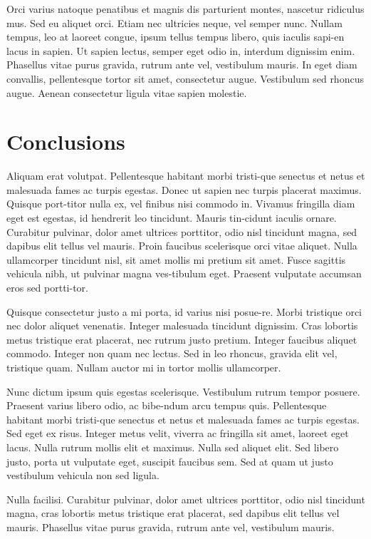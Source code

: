 ﻿\documentclass[10pt,a4paper,twocolumn,twoside]{article}
\begin{document}
Orci varius natoque penatibus et magnis dis parturient montes, nascetur ridiculus mus. Sed eu aliquet orci. Etiam nec ultricies neque, vel semper nunc. Nullam tempus, leo at laoreet congue, ipsum tellus tempus libero, quis iaculis sapi-en lacus in sapien. Ut sapien lectus, semper eget odio in, interdum dignissim enim. Phasellus vitae purus gravida, rutrum ante vel, vestibulum mauris. In eget diam convallis, pellentesque tortor sit amet, consectetur augue. Vestibulum sed rhoncus augue. Aenean consectetur ligula vitae sapien molestie. 


\section{Conclusions}

Aliquam erat volutpat. Pellentesque habitant morbi tristi-que senectus et netus et malesuada fames ac turpis egestas. Donec ut sapien nec turpis placerat maximus. Quisque port-titor nulla ex, vel finibus nisi commodo in. Vivamus fringilla diam eget est egestas, id hendrerit leo tincidunt. Mauris tin-cidunt iaculis ornare. Curabitur pulvinar, dolor amet ultrices porttitor, odio nisl tincidunt magna, sed dapibus elit tellus vel mauris. Proin faucibus scelerisque orci vitae aliquet. Nulla ullamcorper tincidunt nisl, sit amet mollis mi pretium sit amet. Fusce sagittis vehicula nibh, ut pulvinar magna ves-tibulum eget. Praesent vulputate accumsan eros sed portti-tor. 

Quisque consectetur justo a mi porta, id varius nisi posue-re. Morbi tristique orci nec dolor aliquet venenatis. Integer malesuada tincidunt dignissim. Cras lobortis metus tristique erat placerat, nec rutrum justo pretium. Integer faucibus aliquet commodo. Integer non quam nec lectus. Sed in leo rhoncus, gravida elit vel, tristique quam. Nullam auctor mi in tortor mollis ullamcorper. 

Nunc dictum ipsum quis egestas scelerisque. Vestibulum rutrum tempor posuere. Praesent varius libero odio, ac bibe-ndum arcu tempus quis. Pellentesque habitant morbi tristi-que senectus et netus et malesuada fames ac turpis egestas. Sed eget ex risus. Integer metus velit, viverra ac fringilla sit amet, laoreet eget lacus. Nulla rutrum mollis elit et maximus. Nulla sed aliquet elit. Sed libero justo, porta ut vulputate eget, suscipit faucibus sem. Sed at quam ut justo vestibulum vehicula non sed ligula. 

Nulla facilisi. Curabitur pulvinar, dolor amet ultrices porttitor, odio nisl tincidunt magna, cras lobortis metus tristique erat placerat, sed dapibus elit tellus vel mauris. Phasellus vitae purus gravida, rutrum ante vel, vestibulum mauris. 
\end{document}
